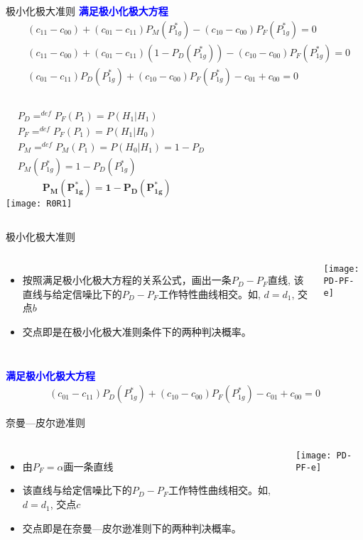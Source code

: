 \begin{frame}[shrink]{极小化极大准则}
\textbf{\textcolor{blue}{满足极小化极大方程}}
\begin{align*}
&(c_{11}-c_{00})+(c_{01}-c_{11})P_M(P_{1g}^\ast)-(c_{10}-c_{00})P_F(P_{1g}^\ast)=0\\
&(c_{11}-c_{00})+(c_{01}-c_{11})\left(1-P_D(P_{1g}^\ast)\right)-(c_{10}-c_{00})P_F(P_{1g}^\ast)=0\\
&(c_{01}-c_{11})P_D(P_{1g}^\ast)+(c_{10}-c_{00})P_F(P_{1g}^\ast)-c_{01}+c_{00}=0
\end{align*}
\begin{columns}[T]
	\begin{align*}
	&P_D \mathop{=}^{def}P_F(P_1)=P(H_1|H_1)\\
	&P_F \mathop{=}^{def}P_F(P_1)=P(H_1|H_0)\\
	&P_M \mathop{=}^{def}P_M(P_1)=P(H_0|H_1)=1-P_D\\
	&P_M(P_{1g}^\ast)=1-P_D(P_{1g}^\ast)
	\end{align*}
	\[\bm{P_M(P_{1g}^\ast)=1-P_D(P_{1g}^\ast)} \]
	\texttt{[image: R0R1]}
\end{columns}
\end{frame}

\begin{frame}[shrink]{极小化极大准则}
\begin{columns}[T]
	\begin{itemize}
		\item 按照满足极小化极大方程的关系公式，画出一条$P_D-P_F$直线, 该直线与给定信噪比下的$P_D-P_F$工作特性曲线相交。如, $d=d_1$, 交点$b$
		\item 交点即是在极小化极大准则条件下的两种判决概率。
	\end{itemize}
	\texttt{[image: PD-PF-e]}
\end{columns}
\textbf{\textcolor{blue}{满足极小化极大方程}}
\begin{align*}
(c_{01}-c_{11})P_D(P_{1g}^\ast)+(c_{10}-c_{00})P_F(P_{1g}^\ast)-c_{01}+c_{00}=0
\end{align*}
\end{frame}

\begin{frame}[shrink]{奈曼---皮尔逊准则}
\begin{columns}[T]
	\begin{itemize}
		\item 由$P_F=\alpha$画一条直线
		\item 该直线与给定信噪比下的$P_D-P_F$工作特性曲线相交。如, $d=d_1$, 交点$c$
		\item 交点即是在奈曼---皮尔逊准则下的两种判决概率。
	\end{itemize}
	\texttt{[image: PD-PF-e]}
\end{columns}
\end{frame}

